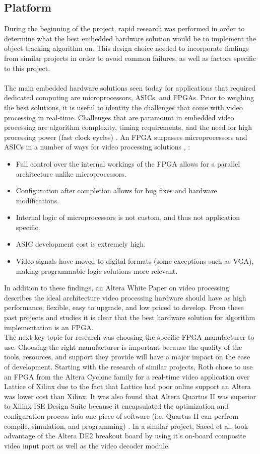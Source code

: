 \documentclass[12pt]{article} %
\begin{document}
\subsection{Platform}
During the beginning of the project, rapid research was performed in order to determine what the best embedded hardware solution would be to implement the object tracking algorithm on. This design choice needed to incorporate findings from similar projects in order to avoid common failures, as well as factors specific to this project. \\\\
The main embedded hardware solutions seen today for applications that required dedicated computing are microprocessors, ASICs, and FPGAs. Prior to weighing the best solutions, it is useful to identity the challenges that come with video processing in real-time. Challenges that are paramount in embedded video processing are algorithm complexity, timing requirements, and the need for high processing power (fast clock cycles) \cite{2}.  An FPGA surpasses microprocessors and ASICs in a number of ways for video processing  solutions \cite{1}, \cite{2}:
\begin{itemize}
\item Full control over the internal workings of the FPGA allows for a parallel architecture unlike microprocessors.
\item Configuration after completion allows for bug fixes and hardware modifications.
\item Internal logic of microprocessors is not custom, and thus not application specific.
\item ASIC development cost is extremely high.
\item Video signals have moved to digital formats (some exceptions such as VGA), making programmable logic solutions more relevant.
\end{itemize}
In addition to these findings, an Altera White Paper \cite{3} on video processing describes the ideal architecture video processing hardware should have as high performance, flexible, easy to upgrade, and low priced to develop. From these past projects and studies it is clear that the best hardware solution for algorithm implementation is an FPGA. \\
The next key topic for research was choosing the specific FPGA manufacturer to use. Choosing the right manufacturer is important because the quality of the tools, resources, and support they provide will have a major impact on the ease of development. Starting with the research of similar projects, Roth \cite{1} chose to use an FPGA from the Altera Cyclone family for a real-time video application over Lattice of Xilinx due to the fact that Lattice had poor online support an Altera was lower cost than Xilinx. It was also found that Altera Quartus II was superior to Xilinx ISE Design Suite because it encapsulated the optimization and configuration process into one piece of software (i.e. Quartus II can perfrom compile, simulation, and programming) \cite{1}. In a similar project, Saeed et al. \cite{2} took advantage of the Altera DE2 breakout board by using it's on-board composite video input port as well as the video decoder module. \\\\
\end{document}

